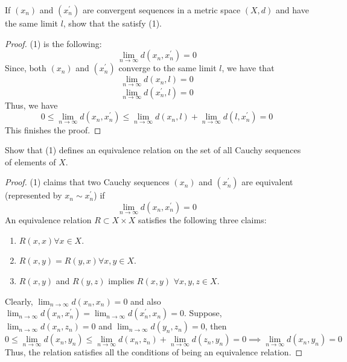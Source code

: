 \begin{question}
    If $(x_n)$ and $(x_n^\prime)$ are convergent sequences in a metric space $(X,d)$ and have the same limit $l$, show that the satisfy (1).
    \label{section1.6-10}
\end{question}
\begin{proof}
     (1) is the following: 
    \[\lim_{n \rightarrow \infty} d(x_n,x_n^\prime) = 0\]
    Since, both $(x_n)$ and $(x_n^\prime)$ converge to the same limit $l$, we have that
    \[\lim_{n \rightarrow \infty} d(x_n,l) = 0\]
    \[\lim_{n \rightarrow \infty} d(x_n^\prime,l) = 0\]
    Thus, we have
    \[0 \leq \lim_{n \rightarrow \infty} d(x_n,x_n^\prime)  \leq \lim_{n \rightarrow \infty} d(x_n,l) + \lim_{n \rightarrow \infty} d(l,x_n^\prime) = 0\]
    This finishes the proof.
\end{proof}

\begin{question}
    Show that (1) defines an equivalence relation on the set of all Cauchy sequences of elements of $X$.
    \label{section1.6-11}
\end{question}
\begin{proof}
    (1) claims that two Cauchy sequences $(x_n)$ and $(x_n^\prime)$ are equivalent (represented by $x_n \sim x_n^\prime$) if 
    \[\lim_{n \rightarrow \infty} d(x_n , x_n^\prime) = 0\]
    An equivalence relation $R \subset X \times X$ satisfies the following three claims:
    \begin{enumerate}
        \item $R(x,x) \forall x \in X$.
        \item $R(x,y) = R(y,x) \forall x, y \in X$.
        \item $R(x,y)$ and $R(y,z)$ implies $R(x,y)$ $\forall x,y,z \in X$.
    \end{enumerate}
    Clearly, $\lim_{n \rightarrow \infty} d(x_n , x_n) = 0$ and also $\lim_{n \rightarrow \infty} d(x_n , x_n^\prime) = \lim_{n \rightarrow \infty} d(x_n^\prime , x_n) = 0$. Suppose, $\lim_{n \rightarrow \infty} d(x_n , z_n) = 0$ and $\lim_{n \rightarrow \infty} d(y_n , z_n) = 0$, then
    \[0 \leq \lim_{n \rightarrow \infty} d(x_n , y_n) \leq \lim_{n \rightarrow \infty} d(x_n , z_n) + \lim_{n \rightarrow \infty} d(z_n , y_n) = 0 \implies \lim_{n \rightarrow \infty} d(x_n , y_n) = 0\]
    Thus, the relation satisfies all the conditions of being an equivalence relation.
\end{proof}

